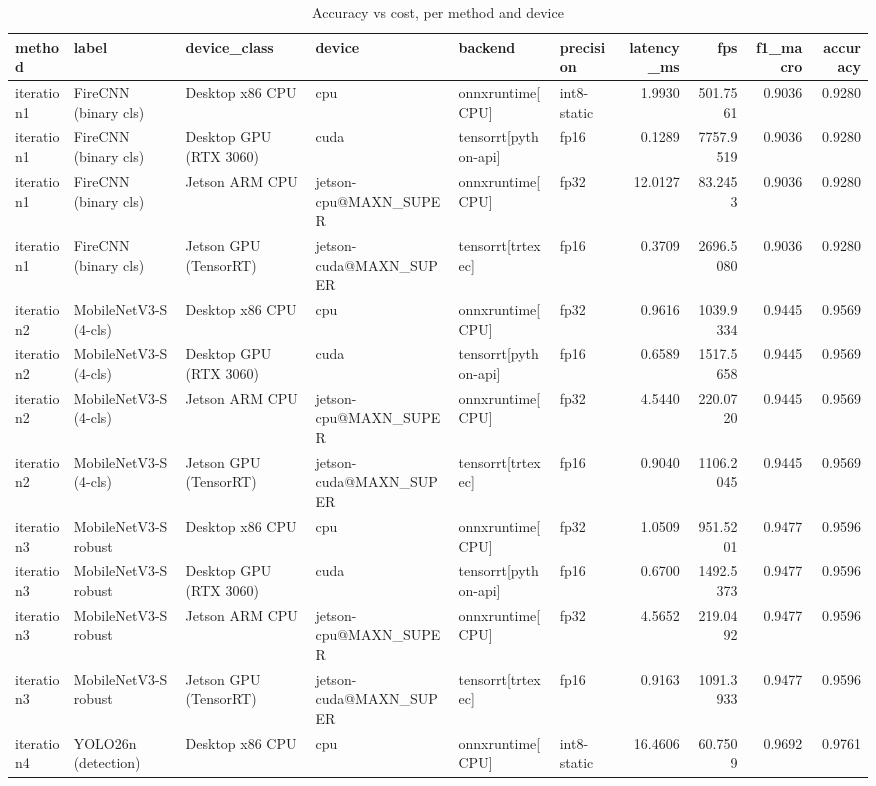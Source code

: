 \begin{table}
\caption{Accuracy vs cost, per method and device}
\begin{tabular}{llllllrrrr}
\toprule
method & label & device\_class & device & backend & precision & latency\_ms & fps & f1\_macro & accuracy \\
\midrule
iteration1 & FireCNN (binary cls) & Desktop x86 CPU & cpu & onnxruntime[CPU] & int8-static & 1.9930 & 501.7561 & 0.9036 & 0.9280 \\
iteration1 & FireCNN (binary cls) & Desktop GPU (RTX 3060) & cuda & tensorrt[python-api] & fp16 & 0.1289 & 7757.9519 & 0.9036 & 0.9280 \\
iteration1 & FireCNN (binary cls) & Jetson ARM CPU & jetson-cpu@MAXN\_SUPER & onnxruntime[CPU] & fp32 & 12.0127 & 83.2453 & 0.9036 & 0.9280 \\
iteration1 & FireCNN (binary cls) & Jetson GPU (TensorRT) & jetson-cuda@MAXN\_SUPER & tensorrt[trtexec] & fp16 & 0.3709 & 2696.5080 & 0.9036 & 0.9280 \\
iteration2 & MobileNetV3-S (4-cls) & Desktop x86 CPU & cpu & onnxruntime[CPU] & fp32 & 0.9616 & 1039.9334 & 0.9445 & 0.9569 \\
iteration2 & MobileNetV3-S (4-cls) & Desktop GPU (RTX 3060) & cuda & tensorrt[python-api] & fp16 & 0.6589 & 1517.5658 & 0.9445 & 0.9569 \\
iteration2 & MobileNetV3-S (4-cls) & Jetson ARM CPU & jetson-cpu@MAXN\_SUPER & onnxruntime[CPU] & fp32 & 4.5440 & 220.0720 & 0.9445 & 0.9569 \\
iteration2 & MobileNetV3-S (4-cls) & Jetson GPU (TensorRT) & jetson-cuda@MAXN\_SUPER & tensorrt[trtexec] & fp16 & 0.9040 & 1106.2045 & 0.9445 & 0.9569 \\
iteration3 & MobileNetV3-S robust & Desktop x86 CPU & cpu & onnxruntime[CPU] & fp32 & 1.0509 & 951.5201 & 0.9477 & 0.9596 \\
iteration3 & MobileNetV3-S robust & Desktop GPU (RTX 3060) & cuda & tensorrt[python-api] & fp16 & 0.6700 & 1492.5373 & 0.9477 & 0.9596 \\
iteration3 & MobileNetV3-S robust & Jetson ARM CPU & jetson-cpu@MAXN\_SUPER & onnxruntime[CPU] & fp32 & 4.5652 & 219.0492 & 0.9477 & 0.9596 \\
iteration3 & MobileNetV3-S robust & Jetson GPU (TensorRT) & jetson-cuda@MAXN\_SUPER & tensorrt[trtexec] & fp16 & 0.9163 & 1091.3933 & 0.9477 & 0.9596 \\
iteration4 & YOLO26n (detection) & Desktop x86 CPU & cpu & onnxruntime[CPU] & int8-static & 16.4606 & 60.7509 & 0.9692 & 0.9761 \\

\end{tabular}
\end{table}
